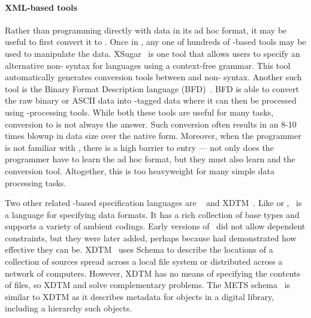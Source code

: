 \paragraph*{XML-based tools}
Rather than programming directly with data in its ad hoc format,
it may be useful to first convert it to \xml.  Once in \xml,
any one of hundreds of \xml-based tools may be used to manipulate the data.
XSugar~\cite{brabrand+:xsugar2005} is one tool that
allows users to specify an
alternative non-\xml{} syntax for \xml{} languages using a
context-free grammar.  This tool automatically generates conversion
tools between \xml{} and non-\xml{} syntax.  Another such tool is
the Binary Format
Description language (BFD)~\cite{bfd}.  BFD is able
to convert the raw binary or ASCII 
data into \xml{}-tagged data where it can then be
processed using \xml{}-processing tools.  While both these tools are
useful for many tasks, conversion to \xml{} is not always the answer.
Such conversion often results in an 8-10 times blowup in data size
over the native form.  Moreover, when the programmer is not familiar with
\xml, there is a high barrier to entry --- not 
only does the programmer have to learn the ad hoc format, 
but they must also learn \xml{} and
the \xml{} conversion tool.  Altogether, this is too heavyweight for
many simple data processing tasks.

Two other related \xml{}-based specification languages are
\dfdl~\cite{dfdl-proposal,dfdl-primer} and XDTM~\cite{xdtm,zhao+:sigmod05}.
Like \pads{} or \packettypes, \dfdl\ is a language for specifying data 
formats.  It has a rich collection of base types and supports a 
variety of ambient codings.  Early versions of \dfdl\ 
did not allow dependent constraints, but they were later added,
perhaps because \pads{} had demonstrated how effective they can be.
XDTM~\cite{xdtm,zhao+:sigmod05} uses \xml{} Schema to describe the
locations of a collection of sources spread across a local file system
or distributed across a network of computers.  However, XDTM has no
means of specifying the contents of files, so XDTM and \pads{} solve
complementary problems.  The METS schema~\cite{mets} is similar to XDTM as
it describes metadata for objects in a digital library, including a
hierarchy such objects.


